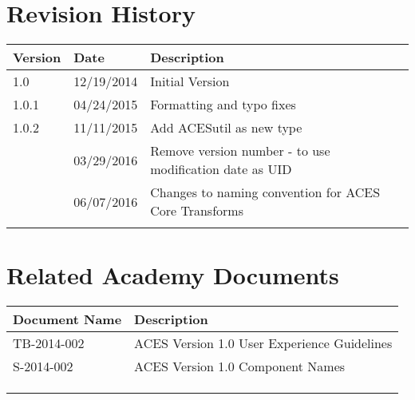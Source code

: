 \prelimsectionformat	%
\chapter{Revision History}

\begin{tabularx}{\linewidth}{|l|l|X|}
    \hline
    Version & Date & Description \\ \hline
    1.0     & 12/19/2014 & Initial Version      \\ \hline
    1.0.1   & 04/24/2015 & Formatting and typo fixes \\ \hline
    1.0.2   & 11/11/2015 & Add ACESutil as new type  \\ \hline
            & 03/29/2016 & Remove version number - to use modification date as UID \\ \hline
            & 06/07/2016 & Changes to naming convention for ACES Core Transforms \\ \hline
            &      &             \\ \hline
\end{tabularx}

\vspace{0.25in} %
\chapter{Related Academy Documents} %
\begin{tabularx}{\linewidth}{|l|X|}
    \hline
    Document Name & Description \\ \hline
    TB-2014-002  & ACES Version 1.0 User Experience Guidelines \\ \hline
    S-2014-002  & ACES Version 1.0 Component Names \\ \hline
    & \\ \hline
    & \\ \hline
    & \\ \hline
\end{tabularx}